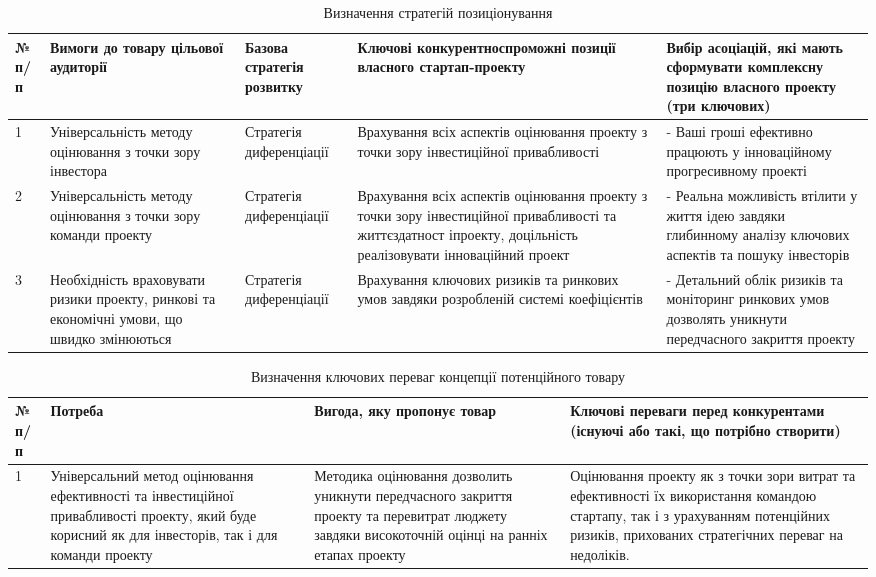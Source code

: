\begin{table}[h!]
\fontsize{12pt}{12pt}\selectfont
	\begin{tabularx}{\textwidth}{|l|X|X|X|X|}
    \hline
    № п/п & Вимоги до товару цільової аудиторії & Базова стратегія розвитку & Ключові конкурентноспроможні позиції власного стартап-проекту & Вибір асоціацій, які мають сформувати комплексну позицію власного проекту (три ключових) \\ \hline
    1 & Універсальність методу оцінювання з точки зору інвестора & Стратегія диференціації & Врахування всіх аспектів оцінювання проекту з точки зору інвестиційної привабливості & - Ваші гроші ефективно працюють у інноваційному прогресивному проекті \\ \hline
    2 & Універсальність методу оцінювання з точки зору команди проекту & Стратегія диференціації & Врахування всіх аспектів оцінювання проекту з точки зору інвестиційної привабливості та життєздатност іпроекту, доцільність реалізовувати інноваційний проект & - Реальна можливість втілити у життя ідею завдяки глибинному аналізу ключових аспектів та пошуку інвесторів \\ \hline
    3 & Необхідність враховувати ризики проекту, ринкові та економічні умови, що швидко змінюються & Стратегія диференціації & Врахування ключових ризиків та ринкових умов завдяки розробленій системі коефіцієнтів & - Детальний облік ризиків та моніторинг ринкових умов дозволять уникнути передчасного закриття проекту \\
    \hline
    \end{tabularx}
\caption{Визначення стратегій позиціонування} \label{tab:stab_12}
\end{table}

\begin{table}[h!]
\fontsize{12pt}{12pt}\selectfont
	\begin{tabularx}{\textwidth}{|l|X|X|X|}
    \hline
    № п/п & Потреба & Вигода, яку пропонує товар & Ключові переваги перед конкурентами (існуючі або такі, що потрібно створити) \\ \hline
    1 & Універсальний метод оцінювання ефективності та інвестиційної привабливості проекту, який буде корисний як для інвесторів, так і для команди проекту & Методика оцінювання дозволить уникнути передчасного закриття проекту та перевитрат люджету завдяки високоточній оцінці на ранніх етапах проекту & Оцінювання проекту як з точки зори витрат та ефективності їх використання командою стартапу, так і з урахуванням потенційних ризиків, прихованих стратегічних переваг на недоліків. \\
    \hline
    \end{tabularx}
\caption{Визначення ключових переваг концепції потенційного товару} \label{tab:stab_13}
\end{table}

